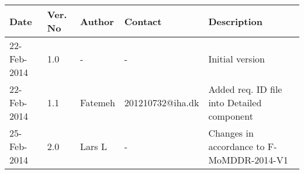 \begin{center}
    \begin{tabular}{ | l | p{1cm} | l | l | p{5cm} |}
    \hline
    Date&Ver. No & Author &Contact &Description\\ \hline
	22-Feb-2014&1.0 & - & - & Initial version\\
    \hline
    	22-Feb-2014&1.1 & Fatemeh & 201210732@iha.dk & Added req. ID file into Detailed component \\
    \hline
    25-Feb-2014&2.0 & Lars L & - & Changes in accordance to F-MoMDDR-2014-V1\\
    \hline
    \end{tabular}
\end{center}